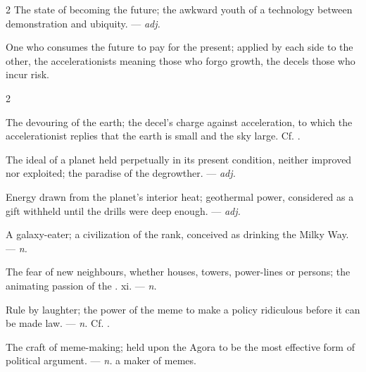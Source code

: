 \begin{multicols}{2}
 The state of becoming the future; the awkward youth of a technology between demonstration and ubiquity.  —  \textit{adj.}

  One who consumes the future to pay for the present; applied by each side to the other, the accelerationists meaning those who forgo growth, the decels those who incur risk.

\end{multicols}

\begin{multicols}{2}

  The devouring of the earth; the decel's charge against acceleration, to which the accelerationist replies that the earth is small and the sky large. Cf. .

 The ideal of a planet held perpetually in its present condition, neither improved nor exploited; the paradise of the degrowther. —  \textit{adj.}

 Energy drawn from the planet's interior heat; geothermal power, considered as a gift withheld until the drills were deep enough. —  \textit{adj.}

 A galaxy-eater; a civilization of the  rank, conceived as drinking the Milky Way. —  \textit{n.}

 The fear of new neighbours, whether houses, towers, power-lines or persons; the animating passion of the .   xi. —  \textit{n.}

 Rule by laughter; the power of the meme to make a policy ridiculous before it can be made law. —  \textit{n.} Cf. .

 The craft of meme-making; held upon the Agora to be the most effective form of political argument.   —  \textit{n.} a maker of memes.


\end{multicols}
